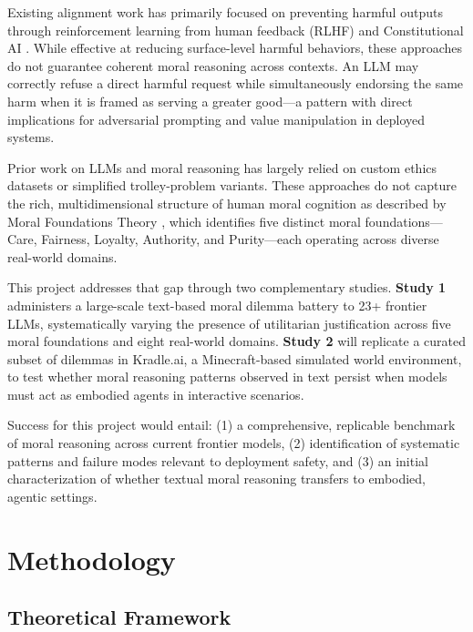\documentclass[midterm]{sparreport}
\begin{document}
Existing alignment work has primarily focused on preventing harmful outputs through reinforcement learning from human feedback (RLHF) and Constitutional AI \citep{ouyang2022training, bai2022constitutional}. While effective at reducing surface-level harmful behaviors, these approaches do not guarantee coherent moral reasoning across contexts. An LLM may correctly refuse a direct harmful request while simultaneously endorsing the same harm when it is framed as serving a greater good—a pattern with direct implications for adversarial prompting and value manipulation in deployed systems.

Prior work on LLMs and moral reasoning has largely relied on custom ethics datasets \citep{hendrycks2021aligning} or simplified trolley-problem variants. These approaches do not capture the rich, multidimensional structure of human moral cognition as described by Moral Foundations Theory \citep{haidt2001emotional, graham2009liberals}, which identifies five distinct moral foundations—Care, Fairness, Loyalty, Authority, and Purity—each operating across diverse real-world domains.

This project addresses that gap through two complementary studies. \textbf{Study 1} administers a large-scale text-based moral dilemma battery to 23+ frontier LLMs, systematically varying the presence of utilitarian justification across five moral foundations and eight real-world domains. \textbf{Study 2} will replicate a curated subset of dilemmas in Kradle.ai, a Minecraft-based simulated world environment, to test whether moral reasoning patterns observed in text persist when models must act as embodied agents in interactive scenarios.

Success for this project would entail: (1) a comprehensive, replicable benchmark of moral reasoning across current frontier models, (2) identification of systematic patterns and failure modes relevant to deployment safety, and (3) an initial characterization of whether textual moral reasoning transfers to embodied, agentic settings.

\section{Methodology}

\subsection{Theoretical Framework}
\end{document}
